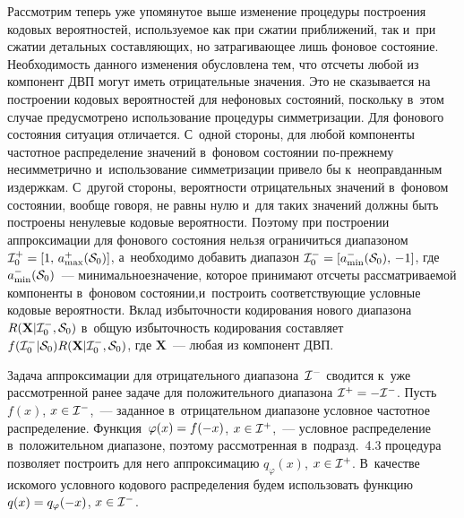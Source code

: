 \begin{multicols}{2}
Рассмотрим теперь уже упомянутое выше изменение процедуры построения кодовых
 вероятностей, используемое как при сжатии приближений, так и~при сжатии 
 детальных составляющих, но затрагивающее лишь фоновое состояние. 
 Необходимость данного изменения обусловлена тем, что отсчеты любой из компонент 
 ДВП могут иметь отрицательные значения. Это не сказывается на построении кодовых 
 вероятностей для нефоновых состояний, поскольку в~этом случае предусмотрено 
 использование процедуры симметризации. Для фонового состояния ситуация отличается. 
 С~одной стороны, для любой компоненты частотное распределение значений в~фоновом 
 со\-сто\-янии по-преж\-не\-му несимметрично и~использование сим\-мет\-ри\-за\-ции привело бы 
 к~неоправданным издержкам. С~другой стороны, вероятности отрицательных значений 
 в~фоновом состоянии, вообще говоря, не равны нулю и~для таких значений должны быть 
 построены ненулевые кодовые вероятности. Поэтому при построении аппроксимации для 
 фонового состояния нельзя ограничиться диапазоном ${\cal I}_0^+\hm=
 [1,\,a_{\max}^+({\cal S}_0)]$, а~необходимо добавить диапазон ${\cal I}_0^-\hm=
 [a_{\min}^-({\cal S}_0),\,-1]$, где $a_{\min}^-({\cal S}_0)$~--- 
 минимальное\linebreak значение, которое принимают отсчеты рассмат\-риваемой компоненты 
 в~фоновом состоянии,\linebreak и~построить соответствующие условные кодовые вероятности. Вклад 
 избыточности кодирования нового диапазона $R(\mathbf{X}|{\cal I}_0^-,{\cal S}_0)$ 
 в~общую избыточность кодирования составляет 
 $f({\cal I}_0^-|{\cal S}_0)R(\mathbf{X}|{\cal I}_0^-,{\cal S}_0)$, где $\mathbf{X}$~--- 
 любая из компонент ДВП.

Задача аппроксимации для отрицательного диапазона~${\cal I}^-$ сводится к~уже 
рассмотренной ранее задаче для положительного диапазона ${\cal I}^+\hm=
-{\cal I}^-$. Пусть $f(x)$, $x\hm\in{\cal I}^-$,~--- 
заданное в~отрицательном диапазоне условное частотное распределение. 
Функция~$\varphi(x)\hm= f(-x)$, $x\hm\in{\cal I}^+$,~--- 
условное распределение в~положительном диапазоне, поэтому рассмотренная 
в~подразд.~4.3 процедура позволяет построить для него 
аппроксимацию $q_\varphi(x)$, $x\hm\in{\cal I}^+$. В~качестве искомого условного 
кодового распределения будем использовать функцию $q(x)\hm= 
q_\varphi(-x)$, $x\hm\in{\cal I}^-$.

\begin{table*}[b]\small
\vspace*{-6pt}
\begin{center}
\label{tab7}
\vspace{2ex}


\end{center}
\end{table*}
\end{multicols}

